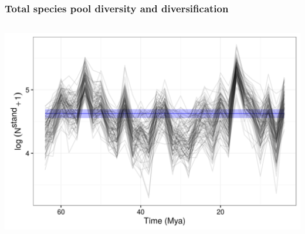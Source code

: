 \documentclass{beamer}
\begin{document}
\begin{frame}
  \frametitle{Total species pool diversity and diversification}
  \begin{columns}
    \begin{column}{0.5\textwidth}
      \begin{center}
        \includegraphics[height=0.4\textheight,width=\textwidth,keepaspectratio=true]{figure/log_diversity}


\end{center}
\end{column}
\end{columns}
\end{frame}
\end{document}
